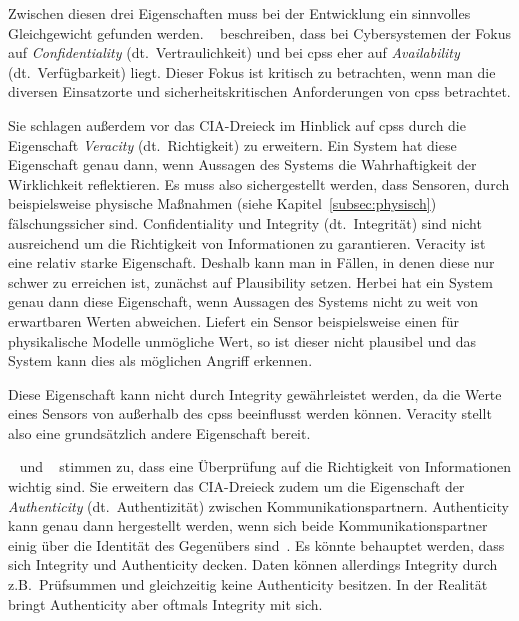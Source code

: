 \documentclass[final,bibliography=totocnumbered]{include/sikseminar}
\newcommand{\cps}{\glspl{cps}\xspace}
\begin{document}
Zwischen diesen drei Eigenschaften muss bei der Entwicklung ein sinnvolles Gleichgewicht gefunden werden.
\citeauthor{GK16}~\cite{GK16} beschreiben, dass bei Cybersystemen der Fokus auf \textit{Confidentiality} (dt.\ Vertraulichkeit) und bei \cps eher auf \textit{Availability} (dt.\ Verfügbarkeit) liegt.
Dieser Fokus ist kritisch zu betrachten, wenn man die diversen Einsatzorte und sicherheitskritischen Anforderungen von \cps betrachtet.

Sie schlagen außerdem vor das CIA-Dreieck im Hinblick auf \cps durch die Eigenschaft \textit{Veracity} (dt.~Richtigkeit) zu erweitern.
Ein System hat diese Eigenschaft genau dann, wenn Aussagen des Systems die Wahrhaftigkeit der  Wirklichkeit reflektieren.
Es muss also sichergestellt werden, dass Sensoren, durch beispielsweise physische Maßnahmen (siehe Kapitel~\ref{subsec:physisch}) fälschungssicher sind.
Confidentiality und Integrity (dt.\ Integrität) sind nicht ausreichend um die Richtigkeit von Informationen zu garantieren.
Veracity ist eine relativ starke Eigenschaft.
Deshalb kann man in Fällen, in denen diese nur schwer zu erreichen ist, zunächst auf Plausibility setzen.
Herbei hat ein System genau dann diese Eigenschaft, wenn Aussagen des Systems nicht zu weit von erwartbaren Werten abweichen.
Liefert ein Sensor beispielsweise einen für physikalische Modelle unmögliche Wert, so ist dieser nicht plausibel und das System kann dies als möglichen Angriff erkennen.~\cite{GK16}

Diese Eigenschaft kann nicht durch Integrity gewährleistet werden, da die Werte eines Sensors von außerhalb des \cps beeinflusst werden können.
Veracity stellt also eine grundsätzlich andere Eigenschaft bereit.

\citeauthor{WYX+10}~\cite{WYX+10} und \citeauthor{SFJ17}~\cite{SFJ17} stimmen zu, dass eine Überprüfung auf die Richtigkeit von Informationen wichtig sind.
Sie erweitern das CIA-Dreieck zudem um die Eigenschaft der \textit{Authenticity} (dt.\ Authentizität) zwischen Kommunikationspartnern.
Authenticity kann genau dann hergestellt werden, wenn sich beide Kommunikationspartner einig über die Identität des Gegenübers sind~\cite{CH13}.
Es könnte behauptet werden, dass sich Integrity und Authenticity decken.
Daten können allerdings Integrity durch z.B.\ Prüfsummen und gleichzeitig keine Authenticity besitzen.
In der Realität bringt Authenticity aber oftmals Integrity mit sich.
\end{document}
